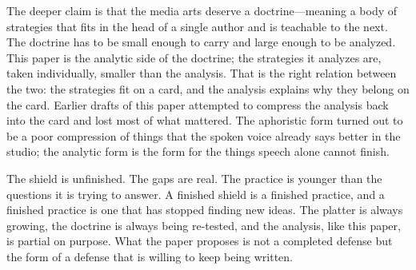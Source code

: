 \documentclass[10pt,letterpaper,twocolumn]{article}
\begin{document}
The deeper claim is that the media arts deserve a doctrine---meaning a body of strategies that fits in the head of a single author and is teachable to the next. The doctrine has to be small enough to carry and large enough to be analyzed. This paper is the analytic side of the doctrine; the strategies it analyzes are, taken individually, smaller than the analysis. That is the right relation between the two: the strategies fit on a card, and the analysis explains why they belong on the card. Earlier drafts of this paper attempted to compress the analysis back into the card and lost most of what mattered. The aphoristic form turned out to be a poor compression of things that the spoken voice already says better in the studio; the analytic form is the form for the things speech alone cannot finish.

The shield is unfinished. The gaps are real. The practice is younger than the questions it is trying to answer. A finished shield is a finished practice, and a finished practice is one that has stopped finding new ideas. The platter is always growing, the doctrine is always being re-tested, and the analysis, like this paper, is partial on purpose. What the paper proposes is not a completed defense but the form of a defense that is willing to keep being written.



\end{document}
